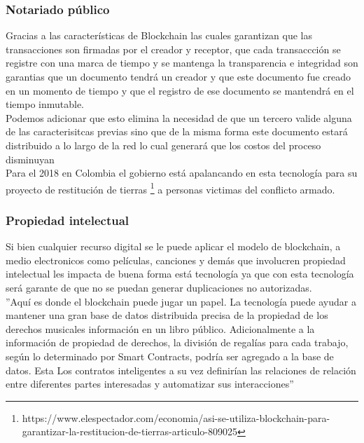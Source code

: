 \subsubsection{Notariado público}
Gracias a las características de Blockchain las cuales garantizan que las transacciones son firmadas por el creador y receptor, que cada transaccción se registre con una marca de tiempo y se mantenga la transparencia e integridad son garantias que un documento  tendrá un creador y que este documento fue creado en un momento de tiempo y que el registro de ese documento se mantendrá en el tiempo inmutable. \citep{zheng2016blockchain}
\\Podemos adicionar que esto elimina la necesidad de que un tercero valide alguna de las caracterisitcas previas sino que de la misma forma este documento estará distribuido a lo largo de la red lo cual generará que los costos del proceso disminuyan \citep{crosby2016blockchain}
\\
Para el 2018 en Colombia el gobierno está apalancando en esta tecnología para su proyecto de restitución de tierras \footnote{https://www.elespectador.com/economia/asi-se-utiliza-blockchain-para-garantizar-la-restitucion-de-tierras-articulo-809025} a personas victimas del conflicto armado.

\subsubsection{Propiedad intelectual}
Si bien cualquier recurso digital se le puede aplicar el modelo de blockchain, a medio electronicos como películas, canciones y demás que involucren propiedad intelectual les impacta de buena forma está tecnología ya que con esta tecnología será garante de que no se puedan generar duplicaciones no autorizadas. \citep{huckle2016internet}
\\
''Aquí es donde el blockchain puede jugar un papel. La tecnología puede ayudar a mantener una gran base de datos distribuida precisa de la propiedad de los derechos musicales información en un libro público. Adicionalmente a la información de propiedad de derechos, la división de regalías para cada trabajo, según lo determinado por Smart Contracts, podría ser agregado a la base de datos. Esta Los contratos inteligentes a su vez definirían las relaciones de relación entre diferentes partes interesadas  y automatizar sus interacciones'' \citep{crosby2016blockchain}

